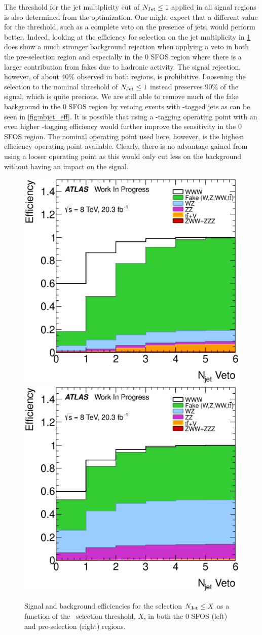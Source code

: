 The threshold for the jet multiplicity cut 
of $N_{\textrm{Jet}}\leq 1$ applied in all signal regions
is also determined from the optimization. One might expect
that a different value for the threshold, such as a complete
veto on the presence of jets, would perform better. 
Indeed, looking at the efficiency for selection on the jet multiplicity
in \fig\ref{fig:njet_eff} does show a much stronger background
rejection when applying a veto in both the pre-selection region
and especially in the 0 SFOS region where there is a larger
contribution from fakes due to hadronic activity.
The signal rejection, however,  of about 40\% observed in both
regions, is prohibitive. Loosening the selection to the nominal
threshold of $N_{\textrm{Jet}} \leq 1$ instead preserves 90\% of the signal, 
which is quite precious.  We are still able to remove 
much of the fake background in the 0 SFOS region by vetoing
events with \bee-tagged jets as can be seen in \fig\ref{fig:nbjet_eff}.
It is possible that using a \bee-tagging operating point
with an even higher \bee-tagging efficiency would further 
improve the sensitivity in the 0 SFOS region.  
The nominal operating point used here, however,  is the highest 
efficiency operating point available.
Clearly, there is no advantage gained from using a looser operating point
as this would only cut less on the background without having an impact
on the signal.



\begin{figure}[ht!]
\centering
\includegraphics[width=0.45\columnwidth]{figures/optimization/SignalRegionsPreselection_0SFOS_Efficiencies/NJets_LeftCumulative.eps}
\includegraphics[width=0.45\columnwidth]{figures/optimization/SignalRegions_0p5mmZ0_Preselection_Efficiencies/NJets_LeftCumulative.eps}
\caption{ Signal and background efficiencies for the selection
$N_{\textrm{Jet}} \leq X$ as a function of the \njet~selection
threshold, $X$, in both the 0 SFOS (left) and pre-selection (right) regions.  }
\label{fig:njet_eff}
\end{figure}

